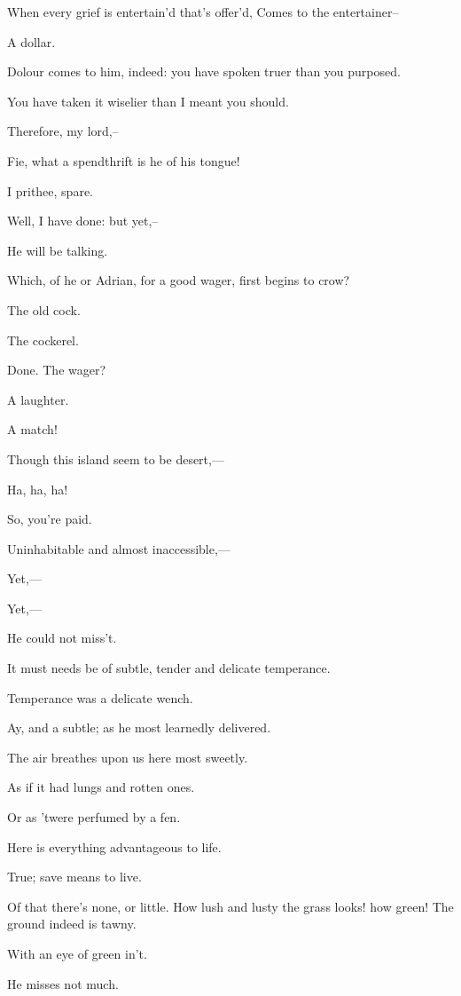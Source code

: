\documentclass[11pt]{book}
\begin{document}
\9	When every grief is entertain'd that's offer'd,
	Comes to the entertainer-- 
\begin{PROSE}

\8	A dollar.

\9	Dolour comes to him, indeed: you
	have spoken truer than you purposed.

\8	You have taken it wiselier than I meant you should.

\9	Therefore, my lord,--

\7	Fie, what a spendthrift is he of his tongue!

\6	I prithee, spare.

\9	Well, I have done: but yet,--

\8	He will be talking.

\7	Which, of he or Adrian, for a good
	wager, first begins to crow?

\8	The old cock.

\7	The cockerel.

\8	Done. The wager?

\7	A laughter.

\8	A match!

	Though this island seem to be desert,---

\7	Ha, ha, ha!

\8 So, you're paid.

	Uninhabitable and almost inaccessible,---

\8	Yet,---

	Yet,---

\7	He could not miss't.

	It must needs be of subtle, tender and delicate
	temperance.

\7	Temperance was a delicate wench.

\8	Ay, and a subtle; as he most learnedly delivered.

	The air breathes upon us here most sweetly.

\8	As if it had lungs and rotten ones.

\7	Or as 'twere perfumed by a fen.

\9	Here is everything advantageous to life.

\7	True; save means to live.

\8	Of that there's none, or little.
\9	How lush and lusty the grass looks! how green!
\7	The ground indeed is tawny.

\8	With an eye of green in't.

\7	He misses not much.


\end{PROSE}
\end{document}
